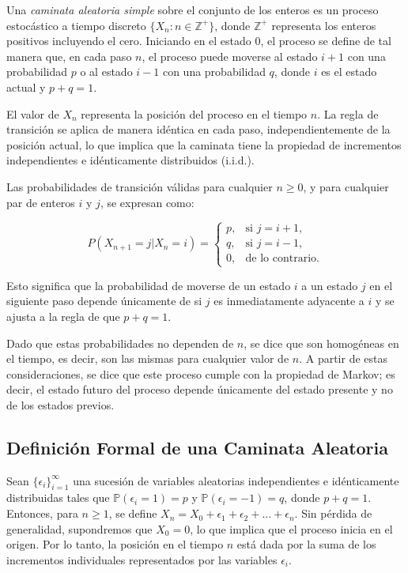\documentclass{article}
\begin{document}
Una \textit{caminata aleatoria simple} sobre el conjunto de los enteros es un proceso estocástico a tiempo discreto $\{X_n: n \in \mathbb{Z}^{+}\}$, donde $\mathbb{Z}^{+}$ representa los enteros positivos incluyendo el cero. Iniciando en el estado 0, el proceso se define de tal manera que, en cada paso $n$, el proceso puede moverse al estado $i+1$ con una probabilidad $p$ o al estado $i-1$ con una probabilidad $q$, donde $i$ es el estado actual y $p + q = 1$.

El valor de $X_n$ representa la posición del proceso en el tiempo $n$. La regla de transición se aplica de manera idéntica en cada paso, independientemente de la posición actual, lo que implica que la caminata tiene la propiedad de incrementos independientes e idénticamente distribuidos (i.i.d.).

Las probabilidades de transición válidas para cualquier $n \geq 0$, y para cualquier par de enteros $i$ y $j$, se expresan como:

\[
    P(X_{n+1} = j | X_n = i) =
    \begin{cases}
        p, & \text{si } j = i + 1,   \\
        q, & \text{si } j = i - 1,   \\
        0, & \text{de lo contrario}.
    \end{cases}
\]

Esto significa que la probabilidad de moverse de un estado $i$ a un estado $j$ en el siguiente paso depende únicamente de si $j$ es inmediatamente adyacente a $i$ y se ajusta a la regla de que $p + q = 1$.

\vspace*{.2cm}

Dado que estas probabilidades no dependen de $n$, se dice que son homogéneas en el tiempo, es decir, son las mismas para cualquier valor de $n$. A partir de estas consideraciones, se dice que este proceso cumple con la propiedad de Markov; es decir, el estado futuro del proceso depende únicamente del estado presente y no de los estados previos.

\subsection*{Definición Formal de una Caminata Aleatoria}

Sean $\{\epsilon_i\}_{i=1}^{\infty}$ una sucesión de variables aleatorias independientes e idénticamente distribuidas tales que $\mathbb{P}(\epsilon_i = 1) = p$ y $\mathbb{P}(\epsilon_i = -1) = q$, donde $p + q = 1$. Entonces, para $n \geq 1$, se define $X_n = X_0 + \epsilon_1 + \epsilon_2 + \dots + \epsilon_n$. Sin pérdida de generalidad, supondremos que $X_0 = 0$, lo que implica que el proceso inicia en el origen. Por lo tanto, la posición en el tiempo $n$ está dada por la suma de los incrementos individuales representados por las variables $\epsilon_i$.
\end{document}
